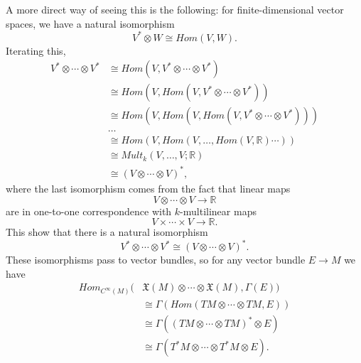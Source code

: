 \documentclass{ximera}
\begin{document}
A more direct way of seeing this is the following: for finite-dimensional vector spaces, we have a natural isomorphism
\[     V^{\ast} \otimes W \cong Hom(V , W) .                   \]
Iterating this, 
\begin{align*}
    V ^{\ast} \otimes \cdots \otimes V^{\ast} & \cong Hom ( V , V^{\ast} \otimes \cdots \otimes  V^{\ast} ) \\
     & \cong Hom ( V ,  Hom ( V , V ^{\ast}  \otimes \cdots \otimes  V^{\ast} ) ) \\
     & \cong Hom ( V ,  Hom ( V , Hom (V ,  V ^{\ast}  \otimes \cdots \otimes  V^{\ast} ) ) ) \\
     & \ldots \\
     & \cong  Hom (V , Hom (V, \ldots , Hom (V, \mathbb{R}) \cdots )) \\
     & \cong Mult_{k} (V , \ldots , V ; \mathbb{R} ) \\
     & \cong ( V \otimes \cdots \otimes V )^{\ast},
\end{align*}
where the last isomorphism comes from the fact that linear maps 
\[ V \otimes \cdots \otimes V  \to \mathbb{R}  \] 
are in one-to-one correspondence with $k$-multilinear maps 
\[  V \times \cdots \times V \to \mathbb{R}. \] 
This show that there is a natural isomorphism 
\[    V ^{\ast} \otimes \cdots \otimes V^{\ast} \cong     ( V \otimes \cdots \otimes V )^{\ast}   .    \]
These isomorphisms pass to  vector bundles, so for any vector bundle $E \to M $ we have
\begin{align*}
    Hom _{C^{\infty}(M)} ( & \mathfrak{X}(M )   \otimes \cdots \otimes   \mathfrak{X}(M) , \Gamma (E) ) \\
    & \cong  \Gamma ( Hom ( TM \otimes \cdots \otimes TM ,  E )) \\
    & \cong \Gamma( ( TM \otimes \cdots \otimes TM ) ^{\ast }  \otimes E ) \\
    & \cong \Gamma ( T^{\ast}M \otimes \cdots \otimes T^{\ast} M \otimes E  ). 
\end{align*}
\end{document}
